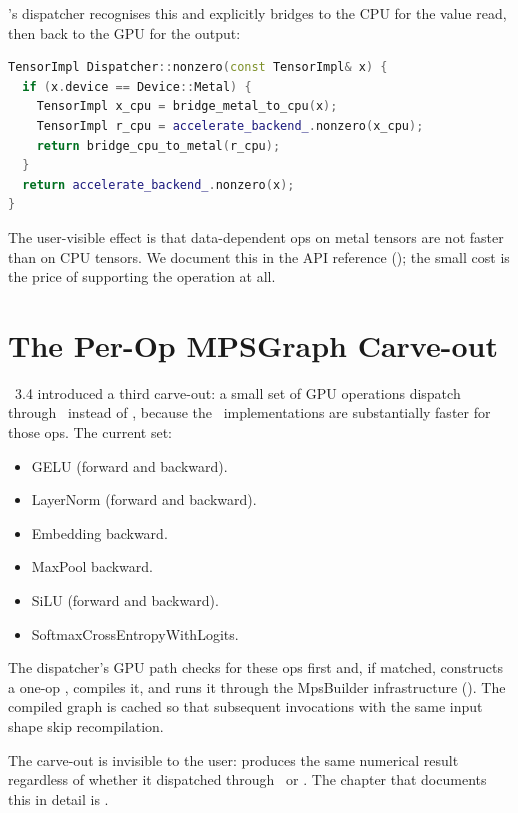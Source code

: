 \Lucid's dispatcher recognises this and explicitly bridges to the
CPU for the value read, then back to the GPU for the output:

\begin{lstlisting}[style=lucidcpp,language=C++]
TensorImpl Dispatcher::nonzero(const TensorImpl& x) {
  if (x.device == Device::Metal) {
    TensorImpl x_cpu = bridge_metal_to_cpu(x);
    TensorImpl r_cpu = accelerate_backend_.nonzero(x_cpu);
    return bridge_cpu_to_metal(r_cpu);
  }
  return accelerate_backend_.nonzero(x);
}
\end{lstlisting}

The user-visible effect is that data-dependent ops on metal tensors
are not faster than on CPU tensors. We document this in the API
reference (); the small cost is the price of
supporting the operation at all.

\section{The Per-Op MPSGraph Carve-out}
\label{sec:backend_dispatch:mpsgraph_carveout}

\Lucid\ 3.4 introduced a third carve-out: a small set of GPU
operations dispatch through \MPSGraph\ instead of \MLX, because the
\MPSGraph\ implementations are substantially faster for those ops.
The current set:

\begin{itemize}
  \item GELU (forward and backward).
  \item LayerNorm (forward and backward).
  \item Embedding backward.
  \item MaxPool backward.
  \item SiLU (forward and backward).
  \item SoftmaxCrossEntropyWithLogits.
\end{itemize}

The dispatcher's GPU path checks for these ops first and, if
matched, constructs a one-op \MPSGraph, compiles it, and runs it
through the MpsBuilder infrastructure
(). The compiled graph is cached so that
subsequent invocations with the same input shape skip recompilation.

The carve-out is invisible to the user:  produces the
same numerical result regardless of whether it dispatched through
\MLX\ or \MPSGraph. The chapter that documents this in detail is
.

